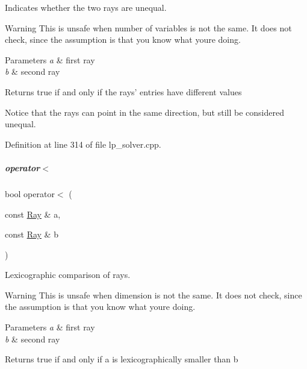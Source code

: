 Indicates whether the two rays are unequal. 

\begin{DoxyWarning}{Warning}
This is unsafe when number of variables is not the same. It does not check, since the assumption is that you know what you\textquotesingle{}re doing. 
\end{DoxyWarning}

\begin{DoxyParams}{Parameters}
{\em a} & first ray \\
\hline
{\em b} & second ray \\
\hline
\end{DoxyParams}
\begin{DoxyReturn}{Returns}
{\ttfamily true} if and only if the rays' entries have different values
\end{DoxyReturn}
Notice that the rays can point in the same direction, but still be considered unequal. 

Definition at line 314 of file lp\+\_\+solver.\+cpp.

\mbox{\label{group___c_l_s_solvers_a4c3d0a1adb5408b59013e6533e144b98}} 
\subparagraph{\texorpdfstring{operator$<$}{operator<}}
{\footnotesize\ttfamily bool operator$<$ (\begin{DoxyParamCaption}\item[{const \hyperlink{group___c_l_s_solvers_class_l_p___solvers_1_1_ray}{Ray} \&}]{a,  }\item[{const \hyperlink{group___c_l_s_solvers_class_l_p___solvers_1_1_ray}{Ray} \&}]{b }\end{DoxyParamCaption})\hspace{0.3cm}{\ttfamily [friend]}}



Lexicographic comparison of rays. 

\begin{DoxyWarning}{Warning}
This is unsafe when dimension is not the same. It does not check, since the assumption is that you know what you\textquotesingle{}re doing. 
\end{DoxyWarning}

\begin{DoxyParams}{Parameters}
{\em a} & first ray \\
\hline
{\em b} & second ray \\
\hline
\end{DoxyParams}
\begin{DoxyReturn}{Returns}
{\ttfamily true} if and only if {\ttfamily a} is lexicographically smaller than {\ttfamily b} 
\end{DoxyReturn}


